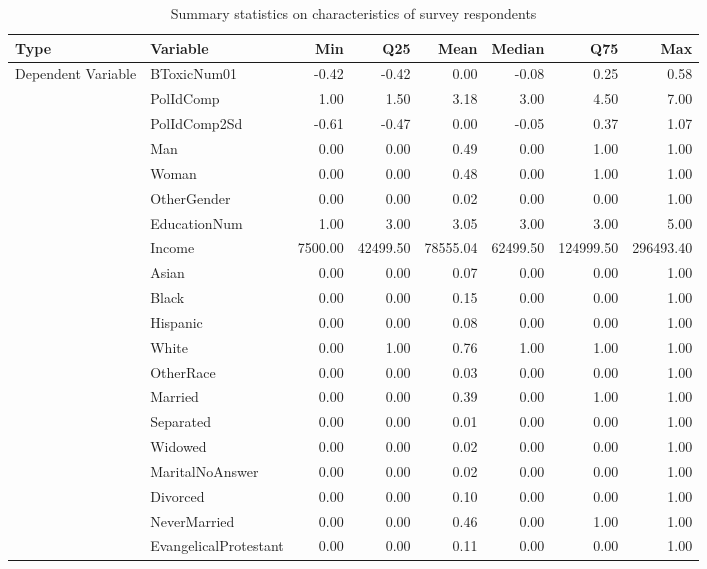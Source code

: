 \begin{table}[!h]
\centering
\caption{\label{tab:summ-tab1}Summary statistics on characteristics of survey respondents}
\centering
\begin{tabular}[t]{llrrrrrr}
\toprule
Type & Variable & Min & Q25 & Mean & Median & Q75 & Max\\
\midrule
Dependent Variable & BToxicNum01 & -0.42 & -0.42 & 0.00 & -0.08 & 0.25 & 0.58\\
\cmidrule{1-8}
 & PolIdComp & 1.00 & 1.50 & 3.18 & 3.00 & 4.50 & 7.00\\
\cmidrule{2-8}
 & PolIdComp2Sd & -0.61 & -0.47 & 0.00 & -0.05 & 0.37 & 1.07\\
\cmidrule{2-8}
 & Man & 0.00 & 0.00 & 0.49 & 0.00 & 1.00 & 1.00\\
\cmidrule{2-8}
 & Woman & 0.00 & 0.00 & 0.48 & 0.00 & 1.00 & 1.00\\
\cmidrule{2-8}
 & OtherGender & 0.00 & 0.00 & 0.02 & 0.00 & 0.00 & 1.00\\
\cmidrule{2-8}
 & EducationNum & 1.00 & 3.00 & 3.05 & 3.00 & 3.00 & 5.00\\
\cmidrule{2-8}
 & Income & 7500.00 & 42499.50 & 78555.04 & 62499.50 & 124999.50 & 296493.40\\
\cmidrule{2-8}
 & Asian & 0.00 & 0.00 & 0.07 & 0.00 & 0.00 & 1.00\\
\cmidrule{2-8}
 & Black & 0.00 & 0.00 & 0.15 & 0.00 & 0.00 & 1.00\\
\cmidrule{2-8}
 & Hispanic & 0.00 & 0.00 & 0.08 & 0.00 & 0.00 & 1.00\\
\cmidrule{2-8}
 & White & 0.00 & 1.00 & 0.76 & 1.00 & 1.00 & 1.00\\
\cmidrule{2-8}
 & OtherRace & 0.00 & 0.00 & 0.03 & 0.00 & 0.00 & 1.00\\
\cmidrule{2-8}
 & Married & 0.00 & 0.00 & 0.39 & 0.00 & 1.00 & 1.00\\
\cmidrule{2-8}
 & Separated & 0.00 & 0.00 & 0.01 & 0.00 & 0.00 & 1.00\\
\cmidrule{2-8}
 & Widowed & 0.00 & 0.00 & 0.02 & 0.00 & 0.00 & 1.00\\
\cmidrule{2-8}
 & MaritalNoAnswer & 0.00 & 0.00 & 0.02 & 0.00 & 0.00 & 1.00\\
\cmidrule{2-8}
 & Divorced & 0.00 & 0.00 & 0.10 & 0.00 & 0.00 & 1.00\\
\cmidrule{2-8}
 & NeverMarried & 0.00 & 0.00 & 0.46 & 0.00 & 1.00 & 1.00\\
\cmidrule{2-8}
 & EvangelicalProtestant & 0.00 & 0.00 & 0.11 & 0.00 & 0.00 & 1.00\\

\end{tabular}
\end{table}
